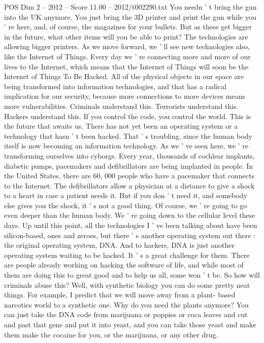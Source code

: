 \begin{textsample}{POS Dim 2 – 2012 – Score 11.00 – 2012/t002290.txt}
You needn ' t bring the gun into the UK anymore.
You just bring the 3D printer and print the gun while you ' re here, and, of course, the magazines for your bullets.
But as these get bigger in the future, what other items will you be able to print?
The technologies are allowing bigger printers.
As we move forward, we ' ll see new technologies also, like the Internet of Things.
Every day we ' re connecting more and more of our lives to the Internet, which means that the Internet of Things will soon be the Internet of Things To Be Hacked.
All of the physical objects in our space are being transformed into information technologies, and that has a radical implication for our security, because more connections to more devices means more vulnerabilities.
Criminals understand this.
Terrorists understand this.
Hackers understand this.
If you control the code, you control the world.
This is the future that awaits us.
There has not yet been an operating system or a technology that hasn ' t been hacked.
That ' s troubling, since the human body itself is now becoming an information technology.
As we ' ve seen here, we ' re transforming ourselves into cyborgs.
Every year, thousands of cochlear implants, diabetic pumps, pacemakers and defibrillators are being implanted in people.
In the United States, there are 60, 000 people who have a pacemaker that connects to the Internet.
The defibrillators allow a physician at a distance to give a shock to a heart in case a patient needs it.
But if you don ' t need it, and somebody else gives you the shock, it ' s not a good thing.
Of course, we ' re going to go even deeper than the human body.
We ' re going down to the cellular level these days.
Up until this point, all the technologies I ' ve been talking about have been silicon-based, ones and zeroes, but there ' s another operating system out there : the original operating system, DNA.
And to hackers, DNA is just another operating system waiting to be hacked.
It ' s a great challenge for them.
There are people already working on hacking the software of life, and while most of them are doing this to great good and to help us all, some won ' t be.
So how will criminals abuse this?
Well, with synthetic biology you can do some pretty neat things.
For example, I predict that we will move away from a plant- based narcotics world to a synthetic one.
Why do you need the plants anymore?
You can just take the DNA code from marijuana or poppies or coca leaves and cut and past that gene and put it into yeast, and you can take those yeast and make them make the cocaine for you, or the marijuana, or any other drug.

\end{textsample}

